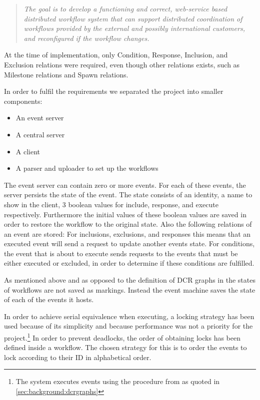 		\begin{quotation}
			\noindent\textit{The goal is to develop a functioning and correct, web-service based distributed workflow system that can support distributed coordination of workflows provided by the external and possibly international customers, and reconfigured if the workflow changes.}
		\end{quotation}
		
		\newpar At the time of implementation, only Condition, Response, Inclusion, and Exclusion relations were required, even though other relations exists, such as Milestone relations and Spawn relations. 
		
		\newpar In order to fulfil the requirements we separated the project into smaller components:
		
		\begin{itemize}
			\item An event server
			\item A central server
			\item A client
			\item A parser and uploader to set up the workflows
		\end{itemize}
		
		\newpar The event server can contain zero or more events. For each of these events, the server persists the state of the event. The state consists of an identity, a name to show in the client, 3 boolean values for include, response, and execute respectively. Furthermore the initial values of these boolean values are saved in order to restore the workflow to the original state. Also the following relations of an event are stored: For inclusions, exclusions, and responses this means that an executed event will send a request to update another events state. For conditions, the event that is about to execute sends requests to the events that must be either executed or excluded, in order to determine if these conditions are fulfilled.
		
		As mentioned above and as opposed to the definition of DCR graphs in \cite{hildebrandt2011declarative} the states of workflows are not saved as markings. Instead the event machine saves the state of each of the events it hosts.
		
		\newpar In order to achieve serial equivalence when executing, a locking strategy has been used because of its simplicity and because performance was not a priority for the project.\footnote{The system executes events using the procedure from \cite{debois2015concurrency} as quoted in \autoref{sec:background:dcrgraphs}} In order to prevent deadlocks, the order of obtaining locks has been defined inside a workflow. The chosen strategy for this is to order the events to lock according to their ID in alphabetical order.
		
